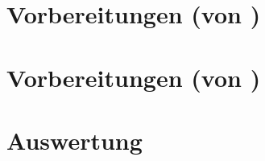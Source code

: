 \documentclass{include/protokollclass}
\begin{document}
	\frontmatter \pagestyle{empty}
	 \clearpage

	\tableofcontents\thispagestyle{empty}
	
	
	
	\MainMatter
	
	\chapter{Vorbereitungen (von \namea)}
	 \cleardoublepage
	\chapter{Vorbereitungen (von \nameb)}
	 \cleardoublepage
	\chapter{Auswertung}
	 \cleardoublepage
	
	\Appendix
	\chapter*{\appendixname}  %
	 \cleardoublepage
	
	
	
	\TheBibliography
	
	
	
	
\end{document}
